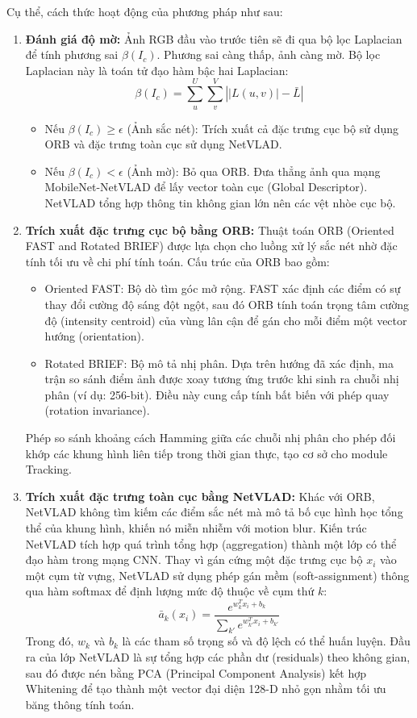 \documentclass[a4paper,12pt]{article}
\begin{document}
Cụ thể, cách thức hoạt động của phương pháp như sau:
\begin{enumerate}
    \item \textbf{Đánh giá độ mờ:} Ảnh RGB đầu vào trước tiên sẽ đi qua bộ lọc Laplacian để tính phương sai $\beta(I_c)$. Phương sai càng thấp, ảnh càng mờ. Bộ lọc Laplacian này là toán tử đạo hàm bậc hai Laplacian: $$\beta(I_c) = \sum_{u}^{U} \sum_{v}^{V} \left\vert{} \vert{}L(u, v)\vert{} - \bar{L} \right\vert{}$$

    \begin{itemize}
        \item Nếu $\beta(I_c) \ge \epsilon$ (Ảnh sắc nét): Trích xuất cả đặc trưng cục bộ sử dụng ORB và đặc trưng toàn cục sử dụng NetVLAD.
        \item Nếu $\beta(I_c) < \epsilon$ (Ảnh mờ): Bỏ qua ORB. Đưa thẳng ảnh qua mạng MobileNet-NetVLAD để lấy vector toàn cục (Global Descriptor). NetVLAD tổng hợp thông tin không gian lớn nên  các vệt nhòe cục bộ.
    \end{itemize}
    
    \item \textbf{Trích xuất đặc trưng cục bộ bằng ORB:} Thuật toán ORB (Oriented FAST and Rotated BRIEF) được lựa chọn cho luồng xử lý sắc nét nhờ đặc tính tối ưu về chi phí tính toán. Cấu trúc của ORB bao gồm:
    \begin{itemize}
        \item Oriented FAST: Bộ dò tìm góc mở rộng. FAST xác định các điểm có sự thay đổi cường độ sáng đột ngột, sau đó ORB tính toán trọng tâm cường độ (intensity centroid) của vùng lân cận để gán cho mỗi điểm một vector hướng (orientation).
        
        \item Rotated BRIEF: Bộ mô tả nhị phân. Dựa trên hướng đã xác định, ma trận so sánh điểm ảnh được xoay tương ứng trước khi sinh ra chuỗi nhị phân (ví dụ: 256-bit). Điều này cung cấp tính bất biến với phép quay (rotation invariance).
    \end{itemize}

    Phép so sánh khoảng cách Hamming giữa các chuỗi nhị phân cho phép đối khớp các khung hình liên tiếp trong thời gian thực, tạo cơ sở cho module Tracking.

    \item \textbf{Trích xuất đặc trưng toàn cục bằng NetVLAD:} Khác với ORB, NetVLAD không tìm kiếm các điểm sắc nét mà mô tả bố cục hình học tổng thể của khung hình, khiến nó miễn nhiễm với motion blur. Kiến trúc NetVLAD tích hợp quá trình tổng hợp (aggregation) thành một lớp có thể đạo hàm trong mạng CNN. Thay vì gán cứng một đặc trưng cục bộ $x_i$ vào một cụm từ vựng, NetVLAD sử dụng phép gán mềm (soft-assignment) thông qua hàm softmax để định lượng mức độ thuộc về cụm thứ $k$: $$\bar{a}_k(x_i) = \frac{e^{w_k^T x_i + b_k}}{\sum_{k'} e^{w_{k'}^T x_i + b_{k'}}}$$
    Trong đó, $w_k$ và $b_k$ là các tham số trọng số và độ lệch có thể huấn luyện. Đầu ra của lớp NetVLAD là sự tổng hợp các phần dư (residuals) theo không gian, sau đó được nén bằng PCA (Principal Component Analysis) kết hợp Whitening để tạo thành một vector đại diện 128-D nhỏ gọn nhằm tối ưu băng thông tính toán.


\end{enumerate}
\end{document}
